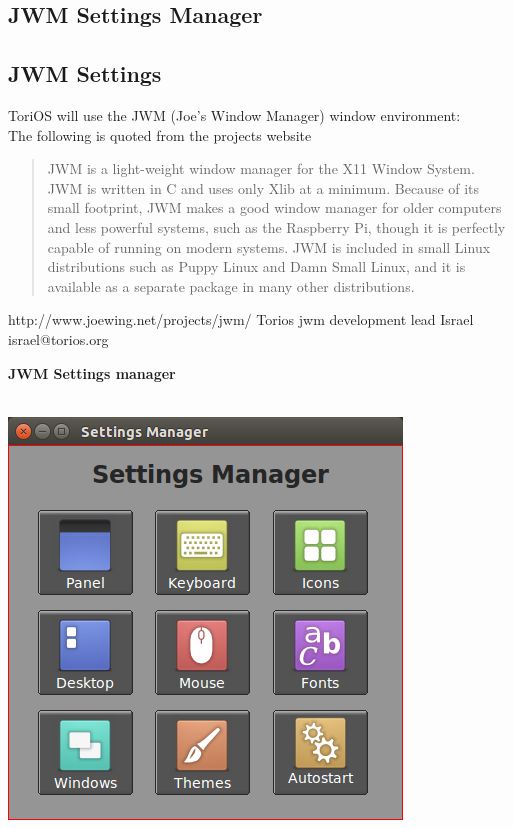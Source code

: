 \documentclass[12pt,a4paper]{book}
\begin{document}
\subsection{JWM Settings Manager}


\subsection{JWM Settings}
ToriOS will use the JWM (Joe's Window Manager) window environment:\\

The following is quoted from the projects website

\begin{quote}
JWM is a light-weight window manager for the X11 Window System. JWM is written in C and uses only Xlib at a minimum. Because of its small footprint, JWM makes a good window manager for older computers and less powerful systems, such as the Raspberry Pi, though it is perfectly capable of running on modern systems. JWM is included in small Linux distributions such as Puppy Linux and Damn Small Linux, and it is available as a separate package in many other distributions. 
\end{quote}
http://www.joewing.net/projects/jwm/
Torios jwm development lead Israel israel@torios.org
\newpage

{\large \textbf{JWM Settings manager}} \\ \\


\begin{center}
\includegraphics[width=0.7\linewidth]{jwmsettingsmanager}
\end{center}
\end{document}
